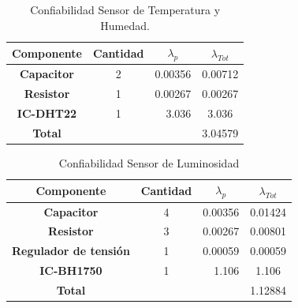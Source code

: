 \begin{table}[H]
\centering
\begin{tabular}{|c|crc|}
\hline
\textbf{Componente} & \multicolumn{1}{c|}{\textbf{Cantidad}} & \multicolumn{1}{c|}{\textbf{$\lambda_p$}}            & \textbf{$\lambda_{Tot}$}   \\ \hline
\textbf{Capacitor}  & \multicolumn{1}{c|}{2}                 & \multicolumn{1}{r|}{0.00356}                         & 0.00712                      \\ \hline
\textbf{Resistor}   & \multicolumn{1}{c|}{1}                 & \multicolumn{1}{r|}{\cellcolor[HTML]{FFFFFF}0.00267} & 0.00267                      \\ \hline
\textbf{IC-DHT22}   & \multicolumn{1}{c|}{1}                 & \multicolumn{1}{r|}{\cellcolor[HTML]{FFFFFF}3.036}   & 3.036                        \\ \hline
\textbf{Total}      & \multicolumn{1}{l}{}                   & \multicolumn{1}{l}{}                                 & \multicolumn{1}{r|}{3.04579} \\ \hline
\end{tabular}
\caption{Confiabilidad Sensor de Temperatura y Humedad.}
\label{tab:conftemphum}
\end{table}
\begin{table}[H]
\centering
\begin{tabular}{|c|crc|}
\hline
\textbf{Componente}           & \multicolumn{1}{c|}{\textbf{Cantidad}} & \multicolumn{1}{c|}{\textbf{$\lambda_p$}}            & \textbf{$\lambda_{Tot}$}   \\ \hline
\textbf{Capacitor}            & \multicolumn{1}{c|}{4}                 & \multicolumn{1}{r|}{0.00356}                         & 0.01424                      \\ \hline
\textbf{Resistor}             & \multicolumn{1}{c|}{3}                 & \multicolumn{1}{r|}{\cellcolor[HTML]{FFFFFF}0.00267} & 0.00801                      \\ \hline
\textbf{Regulador de tensión} & \multicolumn{1}{c|}{1}                 & \multicolumn{1}{r|}{\cellcolor[HTML]{FFFFFF}0.00059} & 0.00059                      \\ \hline
\textbf{IC-BH1750}            & \multicolumn{1}{c|}{1}                 & \multicolumn{1}{r|}{1.106}                           & 1.106                        \\ \hline
\textbf{Total}                & \multicolumn{1}{l}{}                   & \multicolumn{1}{l}{}                                 & \multicolumn{1}{r|}{1.12884} \\ \hline
\end{tabular}
\caption{Confiabilidad Sensor de Luminosidad}
\label{tab:conflum}
\end{table}

